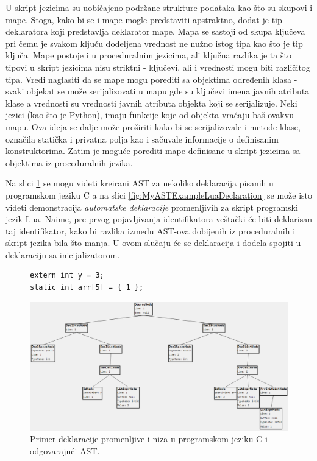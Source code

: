 U skript jezicima su uobičajeno podržane strukture podataka kao što su skupovi i mape. Stoga, kako bi se i mape mogle predstaviti apstraktno, dodat je tip deklaratora koji predstavlja deklarator mape. Mapa se sastoji od skupa ključeva pri čemu je svakom ključu dodeljena vrednost ne nužno istog tipa kao što je tip ključa. Mape postoje i u proceduralnim jezicima, ali ključna razlika je ta što tipovi u skript jezicima nisu striktni - ključevi, ali i vrednosti mogu biti različitog tipa. Vredi naglasiti da se mape mogu porediti sa objektima određenih klasa - svaki objekat se može serijalizovati u mapu gde su ključevi imena javnih atributa klase a vrednosti su vrednosti javnih atributa objekta koji se serijalizuje. Neki jezici (kao što je Python), imaju funkcije koje od objekta vraćaju baš ovakvu mapu. Ova ideja se dalje može proširiti kako bi se serijalizovale i metode klase, označila statička i privatna polja kao i sačuvale informacije o definisanim konstruktorima. Zatim je moguće porediti mape definisane u skript jezicima sa objektima iz proceduralnih jezika.

Na slici \ref{fig:MyASTExampleCDeclaration} se mogu videti kreirani AST za nekoliko deklaracija pisanih u programskom jeziku C a na slici \ref{fig:MyASTExampleLuaDeclaration} se može isto videti demonstracija \emph{automatske deklaracije} promenljivih za skript programski jezik Lua. Naime, pre prvog pojavljivanja identifikatora veštački će biti deklarisan taj identifikator, kako bi razlika između AST-ova dobijenih iz proceduralnih i skript jezika bila što manja. U ovom slučaju će se deklaracija i dodela spojiti u deklaraciju sa inicijalizatorom.

\begin{figure}[h!]
\begin{lstlisting}
extern int y = 3;
static int arr[5] = { 1 };
\end{lstlisting}
\centering
\includegraphics[scale=0.48]{images/c_ast_decl2.png}
\caption{Primer deklaracije promenljive i niza u programskom jeziku C i odgovarajući AST.}
\label{fig:MyASTExampleCDeclaration}
\end{figure}

